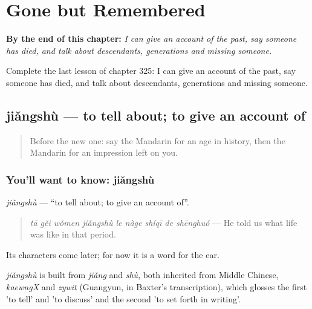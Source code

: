
\chapter{Gone but Remembered}
\label{ch:zh-gone-but-remembered}

\begin{chapteropening}
\textbf{By the end of this chapter:} \emph{I can give an account of the past, say someone has died, and talk about descendants, generations and missing someone.}

Complete the last lesson of chapter 325: I can give an account of the past, say someone has died, and talk about descendants, generations and missing someone.
\end{chapteropening}

\section[jiǎngshù]{jiǎngshù — to tell about; to give an account of}

\label{lesson:ZH-C325-jiangshu}



\begin{quote}
Before the new one: say the Mandarin for an age in history, then the Mandarin for an impression left on you.
\end{quote}

\subsection*{You'll want to know: jiǎngshù}
\emph{jiǎngshù} — \textquotedblleft{}to tell about; to give an account of\textquotedblright{}.

\begin{quote}
\emph{tā gěi wǒmen jiǎngshù le nàge shíqī de shēnghuó} — He told us what life was like in that period.
\end{quote}

Its characters come later; for now it is a word for the ear.

\begin{cousinweb}
\emph{jiǎngshù} is built from \emph{jiǎng} and \emph{shù}, both inherited from Middle Chinese, \emph{kaewngX} and \emph{zywit} (Guangyun, in Baxter's transcription), which glosses the first 'to tell' and 'to discuss' and the second 'to set forth in writing'.
\end{cousinweb}

